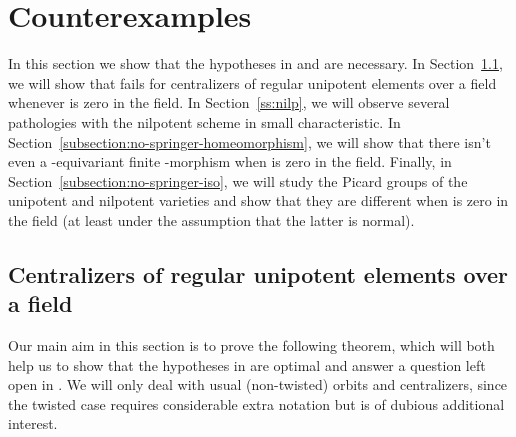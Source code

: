 \documentclass[11pt,reqno]{amsart}
\makeatletter
\theoremstyle{definition}
\renewcommand{\rm}{\mathrm}
\newcommand{\sD}{{\mathscr D}}
\newcommand{\sN}{{\mathscr N}}
\newcommand{\sU}{{\mathscr U}}
\newcounter{mathrecordid}
\newcommand{\mathboxbegin}[1]{%
  \stepcounter{mathrecordid}%
  \immediate\write\mathrecords{\themathrecordid,#1}%
  \special{pdf:bann << /Type /Annot /Subtype /Link /Border [0 0 0]
    /MathBoxID \themathrecordid /F 2
    /A << /S /URI /URI (urn:mathbox:\themathrecordid) >> >>}}
\newcommand{\mathboxinlineplain}[1]{$#1$}
\newcommand{\mathboxinline}[1]{%
  $\mathboxbegin{inline}#1\special{pdf:eann}$}
\newcommand{\recordmath}{%
  \ifmeasuring@\expandafter\mathboxinlineplain
  \else\expandafter\mathboxinline\fi}
\makeatother
\begin{document}
\section{Counterexamples}\label{section:counterexamples}

In this section we show that the hypotheses in \cite[Theorem 3.10]{Integral-Springer} and \cite[Theorem 5.1]{Integral-Springer} are necessary. In Section~\ref{subsection:regular-unipotent-centralizers}, we will show that \cite[Corollary 3.11]{Integral-Springer} fails for centralizers of regular unipotent elements over a field whenever \recordmath{|\pi_1(\sD G)|} is zero in the field. In Section~\ref{ss:nilp}, we will observe several pathologies with the nilpotent scheme in small characteristic. In Section~\ref{subsection:no-springer-homeomorphism}, we will show that there isn't even a \recordmath{G}-equivariant finite \recordmath{k}-morphism \recordmath{\sN_G^{\rm{var}} \to \sU_G^{\rm{var}}} when \recordmath{|\pi_1(\sD G)|} is zero in the field. Finally, in Section~\ref{subsection:no-springer-iso}, we will study the Picard groups of the unipotent and nilpotent varieties and show that they are different when \recordmath{|\pi_1(\sD G)|} is zero in the field (at least under the assumption that the latter is normal).

\subsection{Centralizers of regular unipotent elements over a field}\label{subsection:regular-unipotent-centralizers}

Our main aim in this section is to prove the following theorem, which will both help us to show that the hypotheses in \cite[Theorem 5.1]{Integral-Springer} are optimal and answer a question left open in \cite[Remark 2.7]{BRR}. We will only deal with usual (non-twisted) orbits and centralizers, since the twisted case requires considerable extra notation but is of dubious additional interest.
\end{document}
